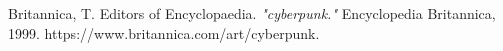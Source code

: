 \documentclass[10pt,conference,onecolumn,compsoc]{IEEEtran}
\begin{document}
\begin{thebibliography}{1}

Britannica, T. Editors of Encyclopaedia. \emph{"cyberpunk."} Encyclopedia Britannica, 		1999. https://www.britannica.com/art/cyberpunk.

\end{thebibliography}










\end{document}
